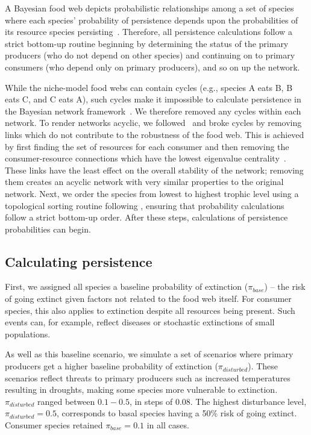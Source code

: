 \documentclass[12pt]{article}
\begin{document}
\begin{spacing}{2.0}
		A Bayesian food web depicts probabilistic relationships among a set of species where each species' probability of persistence depends upon the probabilities of its resource species persisting~\citep{Jensen_Nielsen,Eklof2013}. 
		Therefore, all persistence calculations follow a strict bottom-up routine beginning by determining the status of the primary producers (who do not depend on other species) and continuing on to primary consumers (who depend only on primary producers), and so on up the network.
		
		While the niche-model food webs can contain cycles (e.g., species A eats B, B eats C, and C eats A), such cycles make it impossible to calculate persistence in the Bayesian network framework~\citep{Tarjan1972}. We therefore removed any cycles within each network.
		To render networks acyclic, we followed~\citet{Allesina2009} and broke cycles by removing links which do not contribute to the robustness of the food web.
		This is achieved by first finding the set of resources for each consumer and then removing the consumer-resource connections which have the lowest eigenvalue centrality~\citep{Allesina2009}.
		These links have the least effect on the overall stability of the network; removing them creates an acyclic network with very similar properties to the original network.
		Next, we order the species from lowest to highest trophic level using a topological sorting routine following \citep{Tarjan1972, Allesinaetal2005}, ensuring that probability calculations follow a strict bottom-up order. 
        After these steps, calculations of persistence probabilities can begin.

	\subsection*{Calculating persistence}	

		First, we assigned all species a baseline probability of extinction ($\pi_{base}$) -- the risk of going extinct given factors not related to the food web itself. 
		For consumer species, this also applies to extinction despite all resources being present. 
		Such events can, for example, reflect diseases or stochastic extinctions of small populations. 


		As well as this baseline scenario, we simulate a set of scenarios where primary producers get a higher baseline probability of extinction ($\pi_{disturbed}$). 
		These scenarios reflect threats to primary producers such as increased temperatures resulting in droughts, making some species more vulnerable to extinction.
		$\pi_{disturbed}$ ranged between $0.1-0.5$, in steps of $0.08$. The highest disturbance level, $\pi_{disturbed} = 0.5$, corresponds to basal species having a 50\% risk of going extinct. 
		Consumer species retained $\pi_{base}=0.1$ in all cases.
		

\end{spacing}
\end{document}
